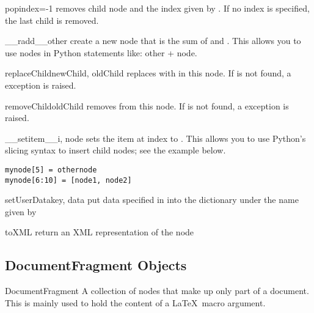 \begin{methoddesc}[Node]{pop}{index=-1}
removes child node and the index given by .  If no index is
specified, the last child is removed.
\end{methoddesc}

\begin{methoddesc}[Node]{__radd__}{other}
create a new node that is the sum of  and .  This
allows you to use nodes in Python statements like: other + node.
\end{methoddesc}

\begin{methoddesc}[Node]{replaceChild}{newChild, oldChild}
replaces  with  in this node.  If 
is not found, a  exception is raised.
\end{methoddesc}

\begin{methoddesc}[Node]{removeChild}{oldChild}
removes  from this node.  If  is not found,
a  exception is raised.
\end{methoddesc}

\begin{methoddesc}[Node]{__setitem__}{i, node}
sets the item at index  to .  This allows you to use 
Python's slicing syntax to insert child nodes; see the example below.
\begin{verbatim}
mynode[5] = othernode
mynode[6:10] = [node1, node2]
\end{verbatim}
\end{methoddesc}

\begin{methoddesc}[Node]{setUserData}{key, data}
put data specified in  into the  dictionary under the
name given by 
\end{methoddesc}

\begin{methoddesc}[Node]{toXML}{}
return an XML representation of the node
\end{methoddesc}


\subsection{DocumentFragment Objects}

\begin{classdesc}{DocumentFragment}{}
A collection of nodes that make up only part of a document.  This is 
mainly used to hold the content of a \LaTeX\ macro argument.
\end{classdesc}


